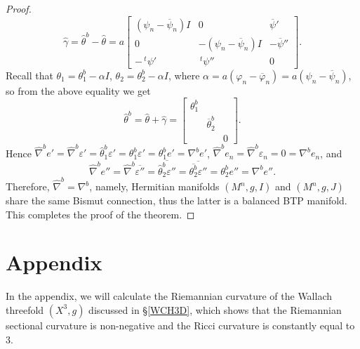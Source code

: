 \documentclass{amsart}
\numberwithin{equation}{section}
\theoremstyle{definition}
\renewcommand{\1}{\mathds{1}}
\renewcommand{\>}{\rightarrow}
\begin{document}
\begin{proof}
$$ \hat{\gamma} = \hat{\theta}^b -\hat{\theta} =  a\! \left[ \begin{array}{ccc}  (\psi_n-\overline{\psi}_n)I & 0 & \overline{\psi}'   \\  0 & - (\psi_n-\overline{\psi}_n)I  &  -\overline{\psi}'' \\ -\,^t\!\psi'  & \,^t\!\psi''  & 0 \end{array} \right]. $$
Recall that $\theta_1=\theta_1^b-\alpha I$, $\theta_2=\theta_2^b-\alpha I$, where $\alpha =a(\varphi_n-\overline{\varphi}_n)=a(\psi_n-\overline{\psi}_n)$, so from the above equality we get
$$  \hat{\theta}^b = \hat{\theta} + \hat{\gamma} =   \left[ \begin{array}{ccc}  \theta_1^b &  &   \\   &  \overline{\theta}_2^b  &   \\  &  & 0 \end{array} \right]. $$
Hence $\hat{\nabla}^be' = \hat{\nabla}^b \varepsilon' = \hat{\theta}^b_1 \varepsilon' = \theta^b_1\varepsilon ' = \theta^b_1 e' = \nabla^b e'$, $\hat{\nabla}^be_n = \hat{\nabla}^b\varepsilon_n =0 = \nabla^b e_n$, and
$$ \hat{\nabla}^be'' = \hat{\nabla}^b \overline{\varepsilon''} = \overline{ \hat{\theta}^b_2 \varepsilon''}  = \overline{ \overline{ \theta^b_2 } \varepsilon''} =  \theta^b_2 e'' =  \nabla^b e''. $$
Therefore, $\hat{\nabla}^b=\nabla^b$, namely, Hermitian manifolds $(M^n,g,I)$ and $(M^n,g,J)$ share the same Bismut connection, thus the latter is a balanced  BTP manifold. This completes the proof of the theorem.
\end{proof}

\vspace{0.4cm}

\section{Appendix}

In the appendix, we will calculate the Riemannian curvature of the Wallach threefold $(X^3,g)$ discussed in \S \ref{WCH3D}, which shows that the Riemannian sectional curvature is non-negative and the Ricci curvature is constantly equal to $3$.
\end{document}
